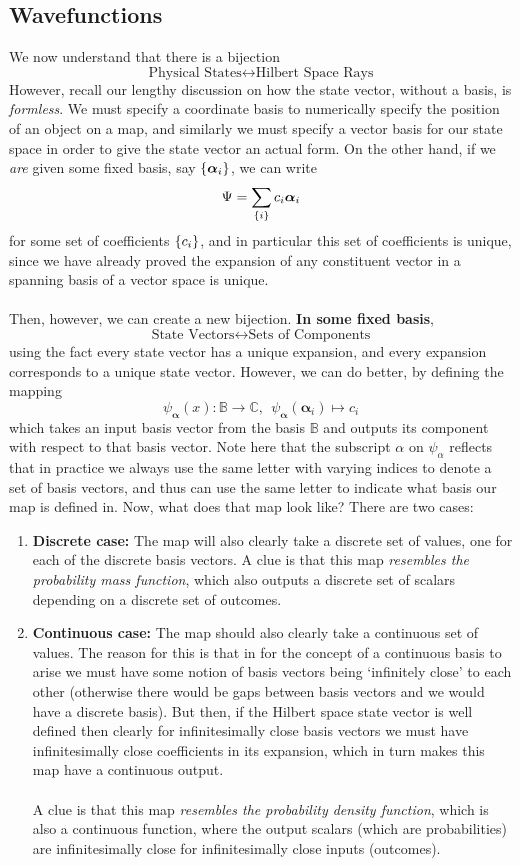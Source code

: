 \subsection{Wavefunctions}
We now understand that there is a bijection 
$$
\text{Physical States} \leftrightarrow \text{Hilbert Space Rays}
$$
However, recall our lengthy discussion on how the state vector, without a basis, is \textit{formless}. We must specify a coordinate basis to numerically specify the position of an object on a map, and similarly we must specify a vector basis for our state space in order to give the state vector an actual form. On the other hand, if we \textit{are} given some fixed basis, say $\{\bm{\alpha}_{i}\}$, we can write
$$
\Psi = \sum_{\{i\}}c_{i}\bm{\alpha}_{i}
$$
for some set of coefficients $\{c_{i}\}$, and in particular this set of coefficients is unique, since we have already proved the expansion of any constituent vector in a spanning basis of a vector space is unique.
\\\\
Then, however, we can create a new bijection. \textbf{In some fixed basis},
$$
\text{State Vectors} \leftrightarrow \text{Sets of Components}
$$
using the fact every state vector has a unique expansion, and every expansion corresponds to a unique state vector. However, we can do better, by defining the mapping
$$
\psi_{\bm{\alpha}}(x) : \mathbb{B} \to \mathbb{C}, \:\: \psi_{\bm{\alpha}}(\bm{\alpha}_{i}) \mapsto c_{i}
$$
which takes an input basis vector from the basis $\mathbb{B}$ and outputs its component with respect to that basis vector. Note here that the subscript $\alpha$ on $\psi_{\alpha}$ reflects that in practice we always use the same letter with varying indices to denote a set of basis vectors, and thus can use the same letter to indicate what basis our map is defined in. Now, what does that map look like? There are two cases:
\begin{enumerate}
    \item \textbf{Discrete case:} The map will also clearly take a discrete set of values, one for each of the discrete basis vectors. A clue is that this map \textit{resembles the probability mass function}, which also outputs a discrete set of scalars depending on a discrete set of outcomes.
    \item \textbf{Continuous case:} The map should also clearly take a continuous set of values. The reason for this is that in for the concept of a continuous basis to arise we must have some notion of basis vectors being `infinitely close' to each other (otherwise there would be gaps between basis vectors and we would have a discrete basis). But then, if the Hilbert space state vector is well defined then clearly for infinitesimally close basis vectors we must have infinitesimally close coefficients in its expansion, which in turn makes this map have a continuous output.
    \\\\
    A clue is that this map \textit{resembles the probability density function}, which is also a continuous function, where the output scalars (which are probabilities) are infinitesimally close for infinitesimally close inputs (outcomes).
\end{enumerate}
